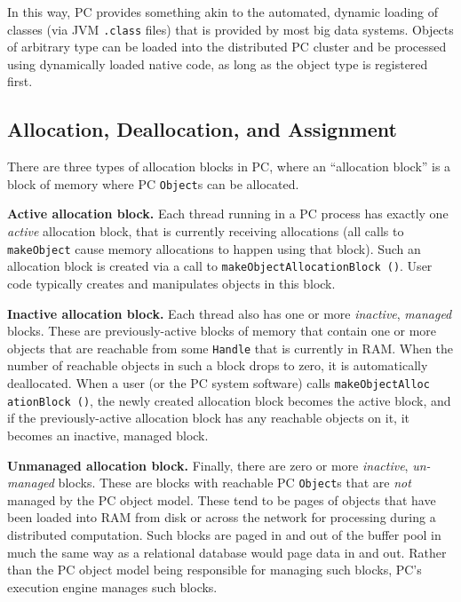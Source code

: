 In this way, PC provides something akin to the automated,
dynamic loading of classes (via JVM \texttt{.class} files) that is
provided by most big data systems.  
Objects of arbitrary type can be loaded into the distributed PC cluster and be
processed using dynamically loaded native code, as long
as the object type is registered first.

\subsection{Allocation, Deallocation, and Assignment}

There are three types of allocation blocks in PC, where an ``allocation block'' is a block of memory where PC \texttt{Object}s can be
allocated.

\vspace{5pt}
\noindent
\textbf{Active allocation block.} Each thread running in a PC process has exactly one \emph{active} allocation block, that is currently receiving allocations (all calls to
\texttt{makeObject} cause memory allocations to happen using that block).  Such an allocation block is created via a call to 
\texttt{makeObjectAllocationBlock ()}.  User code typically creates and manipulates objects in this block.

\vspace{5pt}
\noindent
\textbf{Inactive allocation block.} Each thread also has one or more
\emph{inactive}, \emph{managed} blocks.  These are previously-active blocks of memory that contain one or more objects that are reachable
from some \texttt{Handle} that is currently in RAM.  When the number
of reachable objects in such a block drops to zero, it is automatically
deallocated.
When a user (or the PC system software) calls 
\texttt{makeObjectAlloc ationBlock ()}, the newly created allocation block becomes the active block, and if the previously-active allocation block has any
reachable objects on it, it becomes an inactive, managed block.

\vspace{5pt}
\noindent
\textbf{Unmanaged allocation block.} Finally, there are zero or more \emph{inactive},
  \emph{un-managed} blocks.  These are blocks with reachable PC
  \texttt{Object}s that are \emph{not} managed by the PC object model.  These tend to be pages of objects that have
been loaded into RAM from disk or across the network for processing
during a distributed computation.  Such blocks are paged in and out of the
buffer pool in much the same way as a relational database would page data in and out.
Rather than the PC object model being responsible for managing such blocks, PC's execution engine manages such blocks.

